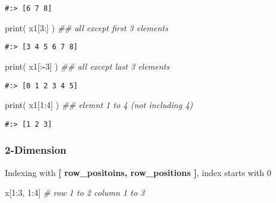 \documentclass[
]{book}
\newenvironment{Shaded}{\begin{snugshade}}{\end{snugshade}}
\newcommand{\BuiltInTok}[1]{#1}
\newcommand{\CommentTok}[1]{\textcolor[rgb]{0.37,0.37,0.37}{\textit{#1}}}
\newcommand{\DecValTok}[1]{\textcolor[rgb]{0.06,0.06,0.06}{#1}}
\newcommand{\NormalTok}[1]{#1}
\newcommand{\OperatorTok}[1]{\textcolor[rgb]{0.43,0.43,0.43}{\textbf{#1}}}
\begin{document}
\begin{verbatim}
#:> [6 7 8]
\end{verbatim}

\begin{Shaded}
\begin{Highlighting}[]
\BuiltInTok{print}\NormalTok{( x1[}\DecValTok{3}\NormalTok{:]  )  }\CommentTok{\#\# all except first 3 elements}
\end{Highlighting}
\end{Shaded}

\begin{verbatim}
#:> [3 4 5 6 7 8]
\end{verbatim}

\begin{Shaded}
\begin{Highlighting}[]
\BuiltInTok{print}\NormalTok{( x1[:}\OperatorTok{{-}}\DecValTok{3}\NormalTok{] )  }\CommentTok{\#\# all except last 3 elements}
\end{Highlighting}
\end{Shaded}

\begin{verbatim}
#:> [0 1 2 3 4 5]
\end{verbatim}

\begin{Shaded}
\begin{Highlighting}[]
\BuiltInTok{print}\NormalTok{( x1[}\DecValTok{1}\NormalTok{:}\DecValTok{4}\NormalTok{] )  }\CommentTok{\#\# elemnt 1 to 4 (not including 4)}
\end{Highlighting}
\end{Shaded}

\begin{verbatim}
#:> [1 2 3]
\end{verbatim}

\hypertarget{dimension-1}{%
\subsubsection{2-Dimension}\label{dimension-1}}

Indexing with \textbf{{[} row\_positoins, row\_positions {]}}, index starts with 0

\begin{Shaded}
\begin{Highlighting}[]
\NormalTok{x[}\DecValTok{1}\NormalTok{:}\DecValTok{3}\NormalTok{, }\DecValTok{1}\NormalTok{:}\DecValTok{4}\NormalTok{] }\CommentTok{\# row 1 to 2 column 1 to 3}
\end{Highlighting}
\end{Shaded}
\end{document}
